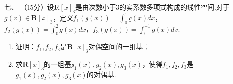 \begin{enumerate}
	\item[七、]（15分）设$\mathbf{R}[x]_3$是由次数小于3的实系数多项式构成的线性空间.对于$g(x)\in\mathbf{R}[x]_3$，定义$f_1(g(x))=\int_0^1g(x)dx$，$f_2(g(x))=\int_0^2g(x)dx$，$f_3(g(x))=\int_0^{-1}g(x)dx$.
    \begin{enumerate}[label=(\arabic*)]
        \item 证明：$f_1,f_2,f_3$是$\mathbf{R}[x]_3$对偶空间的一组基；
        \item 求$\mathbf{R}[x]_3$的一组基$g_1(x),g_2(x),g_3(x)$，使得$f_1,f_2,f_3$是$g_1(x),g_2(x),g_3(x)$的对偶基.
    \end{enumerate}
\end{enumerate}
\newpage
